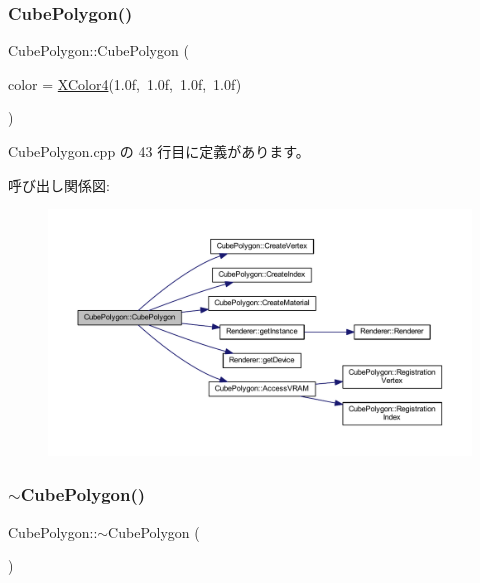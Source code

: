 \subsubsection{\texorpdfstring{Cube\+Polygon()}{CubePolygon()}}
{\footnotesize\ttfamily Cube\+Polygon\+::\+Cube\+Polygon (\begin{DoxyParamCaption}\item[{\mbox{\hyperlink{_vector3_d_8h_a680c30c4a07d86fe763c7e01169cd6cc}{X\+Color4}}}]{color = {\ttfamily \mbox{\hyperlink{_vector3_d_8h_a680c30c4a07d86fe763c7e01169cd6cc}{X\+Color4}}(1.0f,~1.0f,~1.0f,~1.0f)} }\end{DoxyParamCaption})}



 Cube\+Polygon.\+cpp の 43 行目に定義があります。

呼び出し関係図\+:
\nopagebreak
\begin{figure}[H]
\begin{center}
\leavevmode
\includegraphics[width=350pt]{class_cube_polygon_aee418cf078227778280dafb22d7586bb_cgraph}
\end{center}
\end{figure}
\mbox{\label{class_cube_polygon_ae6cd078c65ba32e8da56b8f7d5e92d2a}} 
\subsubsection{\texorpdfstring{$\sim$\+Cube\+Polygon()}{~CubePolygon()}}
{\footnotesize\ttfamily Cube\+Polygon\+::$\sim$\+Cube\+Polygon (\begin{DoxyParamCaption}{ }\end{DoxyParamCaption})}



